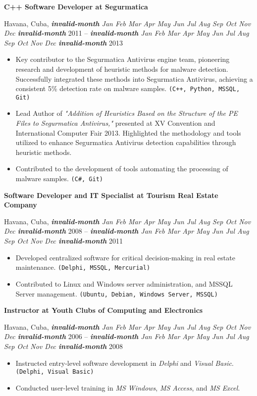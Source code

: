 \documentclass[a4paper]{article}
\newcommand{\invalidmonth}{\emph{\textbf{invalid-month}}}
\newcommand{\cvmonth}[1]{
  \ifcase#1 \invalidmonth
    \or Jan
    \or Feb
    \or Mar
    \or Apr
    \or May
    \or Jun
    \or Jul
    \or Aug
    \or Sep
    \or Oct
    \or Nov
    \or Dec
  \else
    \invalidmonth
  \fi
}
\newcommand{\cvdate}[2]{
  \emph{\cvmonth{#1}} {#2}
}
\newcommand{\cvposition}[2]{
  \noindent\textbf{#1 at #2}\par
}
\newcommand{\cvlocation}[3]{
  \noindent #1, #2 -- #3\par
}
\newenvironment{cvexperience}{
  \noindent{\large\textbf{Work Experience:}}
  \medskip
}{
  \bigskip
}
\newenvironment{cvjob}{
  \begin{sloppypar}
}{
  \end{sloppypar}
  \bigskip
}
\newcommand{\cvskills}[1]{\texttt{(#1)}}
\begin{document}
\begin{cvexperience}
\begin{cvjob}
  \cvposition{C++ Software Developer}{Segurmatica}  
  \cvlocation{Havana, Cuba}{\cvdate{3}{2011}}{\cvdate{6}{2013}}

  \begin{itemize}
    \item Key contributor to the Segurmatica Antivirus engine team, pioneering research and
    development of heuristic methods for malware detection. Successfully integrated these methods
    into Segurmatica Antivirus, achieving a consistent 5\% detection rate on malware samples. \cvskills{C++, Python, MSSQL, Git}
    
    \item Lead Author of \emph{"Addition of Heuristics Based on the Structure
    of the PE Files to Segurmatica Antivirus,"} presented at XV Convention and International Computer Fair
    2013. Highlighted the methodology and tools utilized to enhance Segurmatica Antivirus detection capabilities through heuristic methods.
    
    \item Contributed to the development of tools automating the processing of malware samples. \cvskills{C\#, Git}
  \end{itemize}
\end{cvjob}

\begin{cvjob}
  \cvposition{Software Developer and IT Specialist}{Tourism Real Estate Company}
  \cvlocation{Havana, Cuba}{\cvdate{10}{2008}}{\cvdate{2}{2011}}

  \begin{itemize}
    \item Developed centralized software for critical decision-making in real estate maintenance. \cvskills{Delphi, MSSQL, Mercurial}
    \item Contributed to Linux and Windows server administration, and MSSQL Server management. \cvskills{Ubuntu, Debian, Windows Server, MSSQL}
  \end{itemize}
\end{cvjob}

\begin{cvjob}
  \cvposition{Instructor}{Youth Clubs of Computing and Electronics}
  \cvlocation{Havana, Cuba}{\cvdate{10}{2006}}{\cvdate{9}{2008}}

  \begin{itemize}
    \item Instructed entry-level software development in \emph{Delphi} and \emph{Visual Basic}. \cvskills{Delphi, Visual Basic}
    \item Conducted user-level training in \emph{MS Windows}, \emph{MS Access}, and \emph{MS Excel}.
  \end{itemize}
\end{cvjob}


\end{cvexperience}
\end{document}
